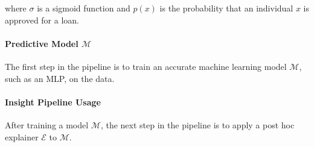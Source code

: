 \documentclass[11pt]{article}    %
\begin{document}
where $\sigma$ is a sigmoid function and $p(x)$ is the probability that an individual $x$ is approved for a loan.

\paragraph{Predictive Model $\mathcal{M}$}
The first step in the pipeline is to train an accurate machine learning model $\mathcal{M}$, such as an MLP, on the data. 

\paragraph{Insight Pipeline Usage}
After training a model $\mathcal{M}$, the next step in the pipeline is to apply a post hoc explainer $\mathcal{E}$ to $\mathcal{M}$. 
 \begin{table}[h]
 \small
\centering
\caption{Description of features for simulated loan data.   }
\end{table}
\end{document}
